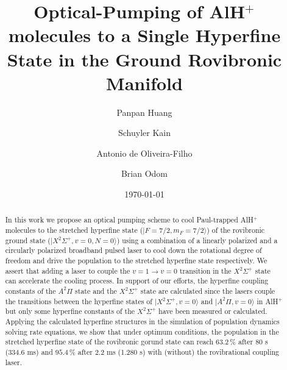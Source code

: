 \documentclass[nofootinbib,aip,jcp,reprint]{revtex4-1}
\begin{document}
\title{Optical-Pumping of AlH$^+$ molecules to a Single Hyperﬁne State in the Ground Rovibronic Manifold}

\author{Panpan Huang}

\author{Schuyler Kain}

\author{Antonio de Oliveira-Filho}

\author{Brian Odom}

\date{\today}

\begin{abstract}
In this work we propose an optical pumping scheme to cool Paul-trapped AlH$^+$ molecules to the stretched hyperfine state ($\lvert F=7/2, m_F=7/2\rangle$) of the rovibronic ground state ($\lvert X^2\Sigma^+, v=0, N=0\rangle$) using a combination of a linearly polarized and a circularly polarized broadband pulsed laser to cool down the rotational degree of freedom and drive the population to the stretched hyperfine state respectively. We assert that adding a laser to couple the $v=1 \rightarrow v=0$ transition in the  $ X^2\Sigma^+$ state can accelerate the cooling process. In support of our efforts, the hyperfine coupling constants of the $A^2\Pi$ state and the $X^2\Sigma^+$ state are calculated since the lasers couple the transitions between the hyperfine states of $\lvert X^2\Sigma^+, v=0\rangle$ and $\lvert A^{2}\Pi, v=0\rangle$ in AlH$^+$ but only some hyperfine constants of the $X^{2}\Sigma^+$ have been measured or calculated. Applying the calculated hyperfine structures in the simulation of population dynamics solving rate equations, we show that under optimum conditions, the population in the stretched hyperfine state of the rovibronic gorund state can reach $63.2\, \%$ after 80 {\micro}s (334.6 ms) and $95.4\, \%$ after 2.2 ms (1.280 s) with (without) the rovibrational coupling laser.
\end{abstract}
\end{document}
